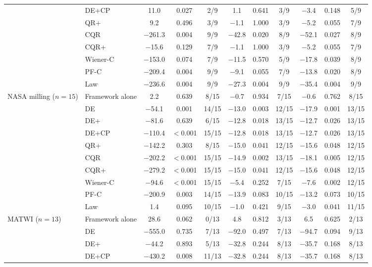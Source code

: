 \begin{table}[!tbp]
\begin{tabular}{llccccccccc}
 & DE+CP & 11.0 & 0.027 & 2/9 & 1.1 & 0.641 & 3/9 & $-$3.4 & 0.148 & 5/9\\
 & QR+ & 9.2 & 0.496 & 3/9 & $-$1.1 & 1.000 & 3/9 & $-$5.2 & 0.055 & 7/9\\
 & CQR & $-$261.3 & 0.004 & 9/9 & $-$42.8 & 0.020 & 8/9 & $-$52.1 & 0.027 & 8/9\\
 & CQR+ & $-$15.6 & 0.129 & 7/9 & $-$1.1 & 1.000 & 3/9 & $-$5.2 & 0.055 & 7/9\\
 & Wiener-C & $-$153.0 & 0.074 & 7/9 & $-$11.5 & 0.570 & 5/9 & $-$17.8 & 0.039 & 8/9\\
 & PF-C & $-$209.4 & 0.004 & 9/9 & $-$9.1 & 0.055 & 7/9 & $-$13.8 & 0.020 & 8/9\\
 & Law & $-$236.6 & 0.004 & 9/9 & $-$27.3 & 0.004 & 9/9 & $-$35.4 & 0.004 & 9/9\\
\midrule
NASA milling ($n=15$) & Framework alone & 2.2 & 0.639 & 8/15 & $-$0.7 & 0.934 & 7/15 & $-$0.6 & 0.762 & 8/15\\
 & DE & $-$54.1 & 0.001 & 14/15 & $-$13.0 & 0.003 & 12/15 & $-$17.9 & 0.001 & 13/15\\
 & DE+ & $-$81.6 & 0.639 & 6/15 & $-$12.8 & 0.018 & 13/15 & $-$12.7 & 0.026 & 13/15\\
 & DE+CP & $-$110.4 & $<$0.001 & 15/15 & $-$12.8 & 0.018 & 13/15 & $-$12.7 & 0.026 & 13/15\\
 & QR+ & $-$142.2 & 0.303 & 8/15 & $-$15.0 & 0.041 & 12/15 & $-$15.6 & 0.048 & 12/15\\
 & CQR & $-$202.2 & $<$0.001 & 15/15 & $-$14.9 & 0.002 & 13/15 & $-$18.1 & 0.005 & 12/15\\
 & CQR+ & $-$279.2 & $<$0.001 & 15/15 & $-$15.0 & 0.041 & 12/15 & $-$15.6 & 0.048 & 12/15\\
 & Wiener-C & $-$94.6 & $<$0.001 & 15/15 & $-$5.4 & 0.252 & 7/15 & $-$7.6 & 0.002 & 12/15\\
 & PF-C & $-$200.9 & 0.003 & 14/15 & $-$13.9 & 0.083 & 10/15 & $-$13.2 & 0.073 & 10/15\\
 & Law & 1.4 & 0.095 & 10/15 & $-$1.0 & 0.421 & 9/15 & $-$3.0 & 0.041 & 11/15\\
\midrule
MATWI ($n=13$) & Framework alone & 28.6 & 0.062 & 0/13 & 4.8 & 0.812 & 3/13 & 6.5 & 0.625 & 2/13\\
 & DE & $-$555.0 & 0.735 & 7/13 & $-$92.0 & 0.497 & 7/13 & $-$94.7 & 0.094 & 9/13\\
 & DE+ & $-$44.2 & 0.893 & 5/13 & $-$32.8 & 0.244 & 8/13 & $-$35.7 & 0.168 & 8/13\\
 & DE+CP & $-$430.2 & 0.008 & 11/13 & $-$32.8 & 0.244 & 8/13 & $-$35.7 & 0.168 & 8/13\\

\end{tabular}
\end{table}
